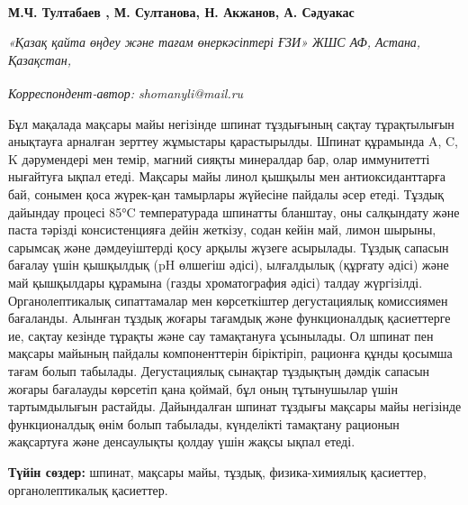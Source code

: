
\begin{articleheader}

{\bfseries
М.Ч. Тултабаев\textsuperscript{\envelope } ,
М. Султанова,
Н. Акжанов,
А. Сәдуакас}
\end{articleheader}

\begin{affiliation}
\emph{«Қазақ қайта өңдеу және тағам өнеркәсіптері ҒЗИ» ЖШС АФ, Астана, Қазақстан,}

\raggedright \textsuperscript{\envelope }{\em Корреспондент-автор: shomanyli@mail.ru}
\end{affiliation}

Бұл мақалада мақсары майы негізінде шпинат тұздығының сақтау
тұрақтылығын анықтауға арналған зерттеу жұмыстары қарастырылды. Шпинат
құрамында A, C, K дәрумендері мен темір, магний сияқты минералдар бар,
олар иммунитетті нығайтуға ықпал етеді. Мақсары майы линол қышқылы мен
антиоксиданттарға бай, сонымен қоса жүрек-қан тамырлары жүйесіне пайдалы
әсер етеді. Тұздық дайындау процесі 85°C температурада шпинатты
бланштау, оны салқындату және паста тәрізді консистенцияға дейін
жеткізу, содан кейін май, лимон шырыны, сарымсақ және дәмдеуіштерді қосу
арқылы жүзеге асырылады. Тұздық сапасын бағалау үшін қышқылдық (pH
өлшегіш әдісі), ылғалдылық (құрғату әдісі) және май қышқылдары құрамына
(газды хроматография әдісі) талдау жүргізілді. Органолептикалық
сипаттамалар мен көрсеткіштер дегустациялық комиссиямен бағаланды.
Алынған тұздық жоғары тағамдық және функционалдық қасиеттерге ие, сақтау
кезінде тұрақты және сау тамақтануға ұсынылады. Ол шпинат пен мақсары
майының пайдалы компоненттерін біріктіріп, рационға құнды қосымша тағам
болып табылады. Дегустациялық сынақтар тұздықтың дәмдік сапасын жоғары
бағалауды көрсетіп қана қоймай, бұл оның тұтынушылар үшін тартымдылығын
растайды. Дайындалған шпинат тұздығы мақсары майы негізінде
функционалдық өнім болып табылады, күнделікті тамақтану рационын
жақсартуға және денсаулықты қолдау үшін жақсы ықпал етеді.

{\bfseries Түйін сөздер:} шпинат, мақсары майы, тұздық, физика-химиялық
қасиеттер, органолептикалық қасиеттер.

